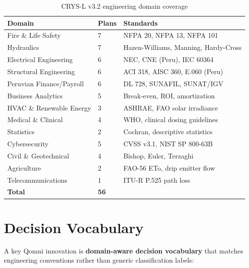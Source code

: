 \documentclass[11pt]{article}
\begin{document}
\begin{table}[h]
\centering
\caption{CRYS-L v3.2 engineering domain coverage}
\label{tab:domains}
\begin{tabular}{lll}
\toprule
\textbf{Domain} & \textbf{Plans} & \textbf{Standards} \\
\midrule
Fire \& Life Safety      & 7 & NFPA 20, NFPA 13, NFPA 101 \\
Hydraulics               & 7 & Hazen-Williams, Manning, Hardy-Cross \\
Electrical Engineering   & 6 & NEC, CNE (Peru), IEC 60364 \\
Structural Engineering   & 6 & ACI 318, AISC 360, E.060 (Peru) \\
Peruvian Finance/Payroll & 6 & DL 728, SUNAFIL, SUNAT/IGV \\
Business Analytics       & 5 & Break-even, ROI, amortization \\
HVAC \& Renewable Energy & 3 & ASHRAE, FAO solar irradiance \\
Medical \& Clinical      & 4 & WHO, clinical dosing guidelines \\
Statistics               & 2 & Cochran, descriptive statistics \\
Cybersecurity            & 5 & CVSS v3.1, NIST SP 800-63B \\
Civil \& Geotechnical    & 4 & Bishop, Euler, Terzaghi \\
Agriculture              & 2 & FAO-56 ETo, drip emitter flow \\
Telecommunications       & 1 & ITU-R P.525 path loss \\
\midrule
\textbf{Total} & \textbf{56} & \\
\bottomrule
\end{tabular}
\end{table}

\section{Decision Vocabulary}

A key Qomni innovation is \textbf{domain-aware decision vocabulary} that matches
engineering conventions rather than generic classification labels:
\end{document}
